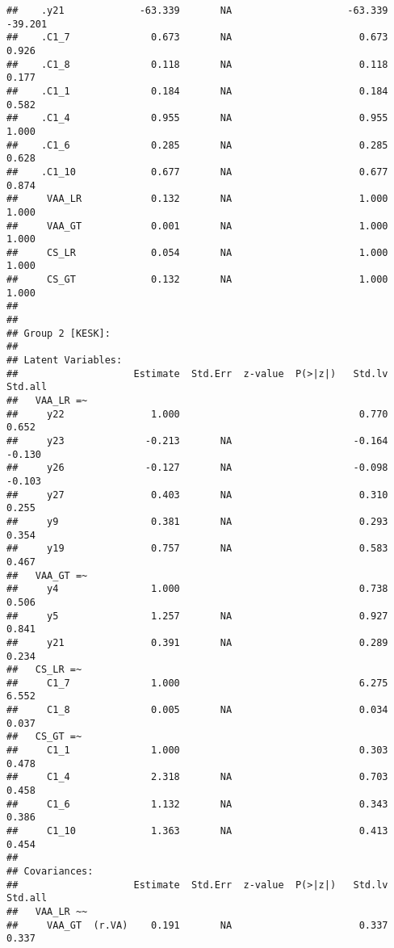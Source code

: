 \documentclass[
]{article}
\begin{document}
\begin{verbatim}
##    .y21             -63.339       NA                    -63.339  -39.201
##    .C1_7              0.673       NA                      0.673    0.926
##    .C1_8              0.118       NA                      0.118    0.177
##    .C1_1              0.184       NA                      0.184    0.582
##    .C1_4              0.955       NA                      0.955    1.000
##    .C1_6              0.285       NA                      0.285    0.628
##    .C1_10             0.677       NA                      0.677    0.874
##     VAA_LR            0.132       NA                      1.000    1.000
##     VAA_GT            0.001       NA                      1.000    1.000
##     CS_LR             0.054       NA                      1.000    1.000
##     CS_GT             0.132       NA                      1.000    1.000
## 
## 
## Group 2 [KESK]:
## 
## Latent Variables:
##                    Estimate  Std.Err  z-value  P(>|z|)   Std.lv  Std.all
##   VAA_LR =~                                                             
##     y22               1.000                               0.770    0.652
##     y23              -0.213       NA                     -0.164   -0.130
##     y26              -0.127       NA                     -0.098   -0.103
##     y27               0.403       NA                      0.310    0.255
##     y9                0.381       NA                      0.293    0.354
##     y19               0.757       NA                      0.583    0.467
##   VAA_GT =~                                                             
##     y4                1.000                               0.738    0.506
##     y5                1.257       NA                      0.927    0.841
##     y21               0.391       NA                      0.289    0.234
##   CS_LR =~                                                              
##     C1_7              1.000                               6.275    6.552
##     C1_8              0.005       NA                      0.034    0.037
##   CS_GT =~                                                              
##     C1_1              1.000                               0.303    0.478
##     C1_4              2.318       NA                      0.703    0.458
##     C1_6              1.132       NA                      0.343    0.386
##     C1_10             1.363       NA                      0.413    0.454
## 
## Covariances:
##                    Estimate  Std.Err  z-value  P(>|z|)   Std.lv  Std.all
##   VAA_LR ~~                                                             
##     VAA_GT  (r.VA)    0.191       NA                      0.337    0.337

\end{verbatim}
\end{document}
